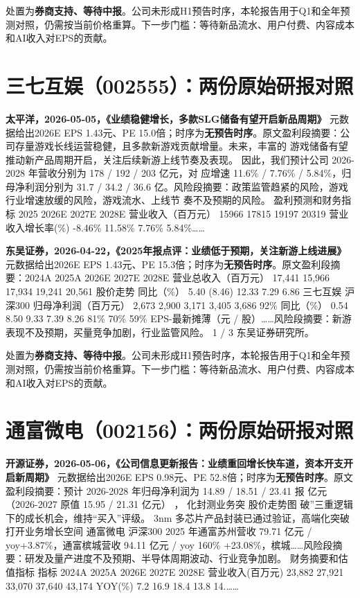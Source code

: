 \begin{keyinsight}[AStock处理]
处置为\textbf{券商支持、等待中报}。公司未形成H1预告时序，本轮报告用于Q1和全年预测对照，仍需按当前价格重算。下一步门槛：等待新品流水、用户付费、内容成本和AI收入对EPS的贡献。
\end{keyinsight}

\section{三七互娱（002555）：两份原始研报对照}

\textbf{太平洋，2026-05-05，《业绩稳健增长，多款SLG储备有望开启新品周期》}
元数据给出2026E EPS 1.43元、PE 15.0倍；时序为\textbf{无预告时序}。原文盈利段摘要：公司存量游戏长线运营稳健，且多款新游戏贡献增量。未来，丰富的 游戏储备有望推动新产品周期开启，关注后续新游上线节奏及表现。 因此，我们预计公司 2026-2028 年营收分别为 178 / 192 / 203 亿元，对 应增速 11.6\% / 7.76\% / 5.84\%，归母净利润分别为 31.7 / 34.2 / 36.6 亿。风险段摘要：政策监管趋紧的风险，游戏行业增速放缓的风险，游戏流水、上线节 奏不及预期的风险。 盈利预测和财务指标 2025 2026E 2027E 2028E 营业收入（百万元） 15966 17815 19197 20319 营业收入增长率(\%) -8.46\% 11.58\% 7.76\% 5.84\%……

\textbf{东吴证券，2026-04-22，《2025年报点评：业绩低于预期，关注新游上线进展》}
元数据给出2026E EPS 1.43元、PE 15.3倍；时序为\textbf{无预告时序}。原文盈利段摘要：2024A 2025A 2026E 2027E 2028E 营业总收入（百万元） 17,441 15,966 17,934 19,241 20,561 股价走势 同比（\%） 5.40 (8.46) 12.33 7.29 6.86 三七互娱 沪深300 归母净利润（百万元） 2,673 2,900 3,171 3,405 3,686 92\% 同比（\%） 0.54 8.50 9.33 7.39 8.26 81\% 70\% 59\% EPS-最新摊薄（元 / 股）……风险段摘要：新游表现不及预期，买量竞争加剧，行业监管风险。 1 / 3 东吴证券研究所。

\begin{keyinsight}[AStock处理]
处置为\textbf{券商支持、等待中报}。公司未形成H1预告时序，本轮报告用于Q1和全年预测对照，仍需按当前价格重算。下一步门槛：等待新品流水、用户付费、内容成本和AI收入对EPS的贡献。
\end{keyinsight}

\section{通富微电（002156）：两份原始研报对照}

\textbf{开源证券，2026-05-06，《公司信息更新报告：业绩重回增长快车道，资本开支开启新周期》}
元数据给出2026E EPS 0.98元、PE 52.8倍；时序为\textbf{无预告时序}。原文盈利段摘要：预计 2026-2028 年归母净利润为 14.89 / 18.51 / 23.41 报 亿元（2026-2027 原值 15.95 / 21.31 亿元） ， 化封测业务突 股价走势图 破”三重逻辑下的成长机会，维持“买入”评级。 3nm 多芯片产品封装已通过验证，高端化突破打开业务增长空间 通富微电 沪深300 2025 年通富苏州营收 79.71 亿元 / yoy+3.87\%，通富槟城营收 94.11 亿元 / yoy 160\% +23.08\%，槟城……风险段摘要：研发及量产进度不及预期、半导体周期波动、行业竞争加剧。 财务摘要和估值指标 指标 2024A 2025A 2026E 2027E 2028E 营业收入(百万元) 23,882 27,921 33,070 37,640 43,174 YOY(\%) 7.2 16.9 18.4 13.8 14.……

